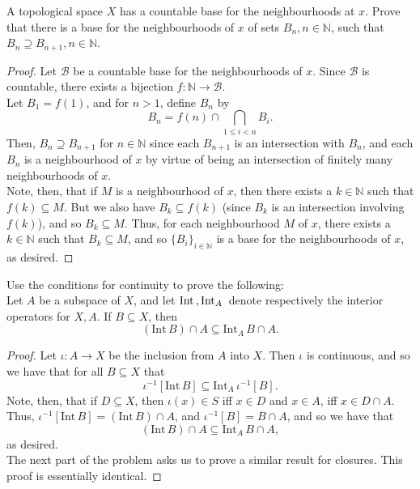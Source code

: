 \documentclass[12pt]{article}
\newenvironment{problem}[2][Problem]{\begin{trivlist}
\item[\hskip \labelsep {\bfseries #1}\hskip \labelsep {\bfseries #2.}]}{\end{trivlist}}
\newcommand{\Int}[1]{\text{Int}\,#1}
\newcommand{\Ints}[2]{\text{Int}_{#1}\,#2}
\newcommand{\N}{\mathbb{N}}
\begin{document}
\begin{problem}{6.5}
  A topological space $X$ has a countable base for the neighbourhoods at $x$.
  Prove that there is a base for the neighbourhoods of $x$ of sets 
  $B_n,n\in\N$, such that \\ $B_n\supseteq B_{n+1},n\in\N$.
\end{problem}
\begin{proof}
  Let $\mathcal{B}$ be a countable base for the neighbourhoods of $x$.
  Since $\mathcal{B}$ is countable, there exists a bijection 
  $f:\N\to\mathcal{B}$. \\
  \indent Let $B_1=f(1)$, and for $n>1$, define $B_n$ by
  \begin{equation*}
    B_n = f(n)\cap\bigcap_{1\leq i<n} B_i.
  \end{equation*}
  Then, $B_n\supseteq B_{n+1}$ for $n\in\N$ since each $B_{n+1}$ is
  an intersection with $B_n$, and each $B_n$ is a neighbourhood of $x$
  by virtue of being an intersection of finitely many neighbourhoods of $x$.\\
  \indent Note, then, that if $M$ is a neighbourhood of $x$, then there exists
  a $k\in\N$ such that $f(k)\subseteq M$.
  But we also have $B_k\subseteq f(k)$ (since $B_k$ is an intersection
  involving $f(k)$), and so $B_k\subseteq M$.
  Thus, for each neighbourhood $M$ of $x$, there exists a $k\in\N$ such
  that $B_k\subseteq M$, and so $\{B_i\}_{i\in\N}$ is a base for the
  neighbourhoods of $x$, as desired.
\end{proof}

\begin{problem}{6.6}
  Use the conditions for continuity to prove the following:\\
  \indent Let $A$ be a subspace of $X$, and let $\Int, \Ints{A}$ denote 
  respectively the interior operators for $X,A$.
  If $B\subseteq X$, then
  \begin{equation*}
    (\Int B)\cap A\subseteq\Ints{A}{B\cap A}.
  \end{equation*}
\end{problem}
\begin{proof}
  Let $\iota:A\to X$ be the inclusion from $A$ into $X$.
  Then $\iota$ is continuous, and so we have that for all $B\subseteq X$ that
  \begin{equation*}
    \iota^{-1}[\Int B]\subseteq\Ints{A}\iota^{-1}[B].
  \end{equation*}
  Note, then, that if $D\subseteq X$, then $\iota(x)\in S$ iff 
  $x\in D$ and $x\in A$, iff $x\in D\cap A$.
  Thus, $\iota^{-1}[\Int B]= (\Int B)\cap A$, and $\iota^{-1}[B] = B\cap A$,
  and so we have that
  \begin{equation*}
    (\Int B)\cap A\subseteq \Ints{A}{B\cap A},
  \end{equation*}
  as desired. \\
  \indent The next part of the problem asks us to prove a similar result
  for closures.
  This proof is essentially identical.
\end{proof}
\end{document}
